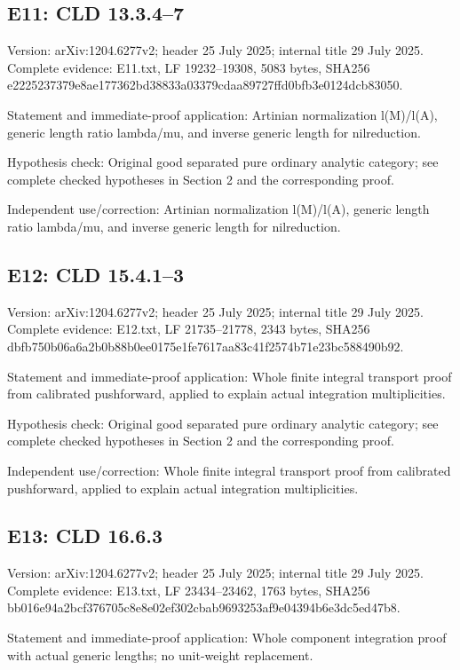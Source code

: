 \documentclass[11pt]{article}
\begin{document}
\subsection{E11: CLD 13.3.4--7}

Version: arXiv:1204.6277v2; header 25 July 2025; internal title 29 July 2025. Complete evidence: E11.txt, LF 19232--19308, 5083 bytes, SHA256 e2225237379e8ae177362bd38833a03379cdaa89727ffd0bfb3e0124dcb83050.

Statement and immediate-proof application: Artinian normalization l(M)/l(A), generic length ratio lambda/mu, and inverse generic length for nilreduction.

Hypothesis check: Original good separated pure ordinary analytic category; see complete checked hypotheses in Section 2 and the corresponding proof.

Independent use/correction: Artinian normalization l(M)/l(A), generic length ratio lambda/mu, and inverse generic length for nilreduction.

\subsection{E12: CLD 15.4.1--3}

Version: arXiv:1204.6277v2; header 25 July 2025; internal title 29 July 2025. Complete evidence: E12.txt, LF 21735--21778, 2343 bytes, SHA256 dbfb750b06a6a2b0b88b0ee0175e1fe7617aa83c41f2574b71e23bc588490b92.

Statement and immediate-proof application: Whole finite integral transport proof from calibrated pushforward, applied to explain actual integration multiplicities.

Hypothesis check: Original good separated pure ordinary analytic category; see complete checked hypotheses in Section 2 and the corresponding proof.

Independent use/correction: Whole finite integral transport proof from calibrated pushforward, applied to explain actual integration multiplicities.

\subsection{E13: CLD 16.6.3}

Version: arXiv:1204.6277v2; header 25 July 2025; internal title 29 July 2025. Complete evidence: E13.txt, LF 23434--23462, 1763 bytes, SHA256 bb016e94a2bcf376705c8e8e02ef302cbab9693253af9e04394b6e3dc5ed47b8.

Statement and immediate-proof application: Whole component integration proof with actual generic lengths; no unit-weight replacement.
\end{document}
